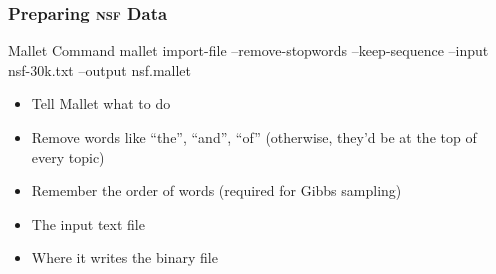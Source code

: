 \begin{frame}[fragile]

  \frametitle{Preparing \textsc{nsf} Data}

  \begin{block}{Mallet Command}
    mallet \alert<2>{import-file} \alert<3>{--remove-stopwords} \alert<4>{--keep-sequence} \alert<5>{--input nsf-30k.txt} \alert<6>{--output nsf.mallet}
  \end{block}

  \pause

  \begin{itemize}
    \item \alert<2>{Tell Mallet what to do}
    \item \alert<3>{Remove words like ``the'', ``and'', ``of''} (otherwise, they'd be at the top of every topic)
    \item \alert<4>{Remember the order of words} (required for Gibbs sampling)
    \item \alert<5>{The input text file}
    \item \alert<6>{Where it writes the binary file}
  \end{itemize}

\end{frame}

%
%
%


